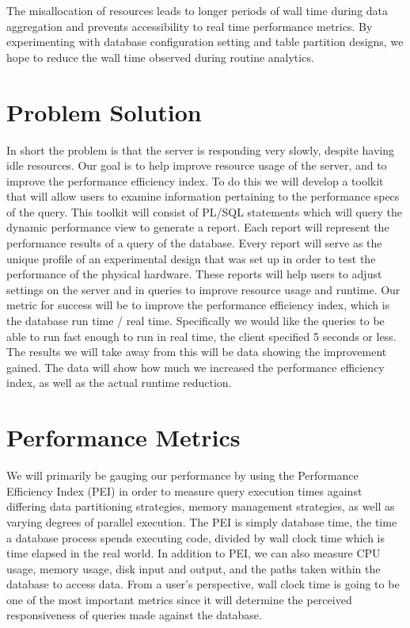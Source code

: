 \documentclass[letterpaper, 10pt, titlepage]{article}
\begin{document}
The misallocation of resources leads to longer periods of wall time during data aggregation and prevents accessibility to real time performance metrics. By experimenting with database configuration setting and table partition designs, we hope to reduce the wall time observed during routine analytics. 

\section*{Problem Solution}
In short the problem is that the server is responding very slowly, despite having idle resources. Our goal is to help improve resource usage of the server, and to improve the performance efficiency index. To do this we will develop a toolkit that will allow users to examine information pertaining to the performance specs of the query. This toolkit will consist of PL/SQL statements which will query the dynamic performance view to generate a report. Each report will represent the performance results of a query of the database. Every report will serve as the unique profile of an experimental design that was set up in order to test the performance of the physical hardware. These reports will help users to adjust settings on the server and in queries to improve resource usage and runtime. Our metric for success will be to improve the performance efficiency index, which is the database run time / real time. Specifically we would like the queries to be able to run fast enough to run in real time, the client specified 5 seconds or less. The results we will take away from this will be data showing the improvement gained. The data will show how much we increased the performance efficiency index, as well as the actual runtime reduction. 

\section*{Performance Metrics}
We will primarily be gauging our performance by using the Performance Efficiency Index (PEI) in order to measure query execution times against differing data partitioning strategies, memory management strategies, as well as varying degrees of parallel execution. The PEI is simply database time, the time a database process spends executing code, divided by wall clock time which is time elapsed in the real world. In addition to PEI, we can also measure CPU usage, memory usage, disk input and output, and the paths taken within the database to access data. From a user’s perspective, wall clock time is going to be one of the most important metrics since it will determine the perceived responsiveness of queries made against the database.
\end{document}

